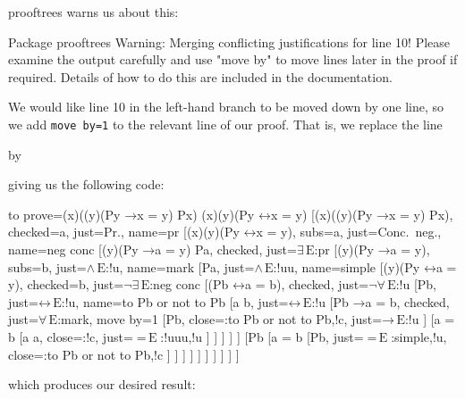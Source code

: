 \documentclass[10pt,british,a4paper]{ltxdoc}
\newcommand*\pkg[1]{\textsf{#1}}
\newcommand*{\lif}{\ensuremath{\mathbin{\rightarrow}}}
\newcommand*{\liff}{\ensuremath{\mathbin{\leftrightarrow}}}
\newcommand*{\elim}{\,\text{E}}
\begin{document}
\pkg{prooftrees} warns us about this:
\begin{latexcode}
Package prooftrees Warning: Merging conflicting justifications for line 10! Please examine the output carefully and use "move by" to move lines later in the proof if required. Details of how to do this are included in the documentation.
\end{latexcode}
We would like line 10 in the left-hand branch to be moved down by one line, so we add \verb|move by=1| to the relevant line of our proof.
That is, we replace the line
\begin{latexcode}
                  [{Pb \lif a = b}, checked, just=4 $\forall\elim$
\end{latexcode}
by
\begin{latexcode}
                  [{Pb \lif a = b}, checked, just=$\forall\elim$:mark, move by=1
\end{latexcode}
giving us the following code:
\begin{latexcode}
\begin{prooftree}
  {
    to prove={(\exists x)((\forall y)(Py \lif x = y) \land Px) \sststile{}{} (\exists x)(\forall y)(Py \liff x = y)}
  }
  [{(\exists x)((\forall y)(Py \lif x = y) \land Px)}, checked=a, just=Pr., name=pr
    [{\lnot (\exists x)(\forall y)(Py \liff x = y)}, subs=a, just=Conc.~neg., name=neg conc
      [{(\forall y)(Py \lif a = y) \land Pa}, checked, just=$\exists\elim$:pr
        [{(\forall y)(Py \lif a = y)}, subs=b, just=$\land\elim$:!u, name=mark
          [Pa, just=$\land\elim$:!uu, name=simple
            [{\lnot (\forall y)(Py \liff a = y)}, checked=b, just=$\lnot\exists\elim$:neg conc
              [{\lnot (Pb \liff a = b)}, checked, just=$\lnot\forall\elim$:!u
                [Pb, just=$\liff\elim$:!u, name=to Pb or not to Pb
                 [a \neq b, just=$\liff\elim$:!u
                  [{Pb \lif a = b}, checked, just=$\forall\elim$:mark, move by=1
                      [\lnot Pb, close={:to Pb or not to Pb,!c}, just=$\lif\elim$:!u
                      ]
                      [{a = b}
                        [a \neq a, close={:!c}, just={$=\elim$:{!uuu,!u}}
                        ]
                      ]
                  ]
                ]
                ]
                [\lnot Pb
                 [{a = b}
                    [Pb, just={$=\elim$:{simple,!u}}, close={:to Pb or not to Pb,!c}
                    ]
                 ]
                ]
              ]
            ]
          ]
        ]
      ]
    ]
  ]
\end{prooftree}
\end{latexcode}
which produces our desired result:
\end{document}
